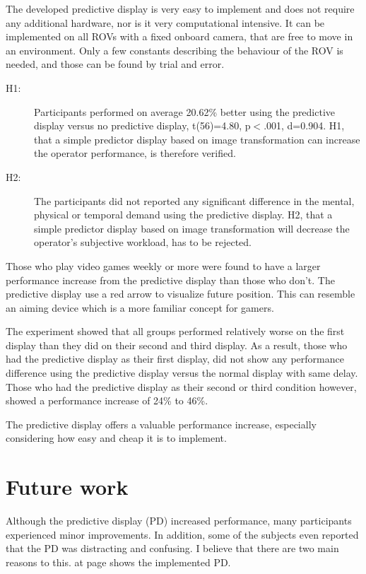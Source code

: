 The developed predictive display is very easy to implement and does not require any additional hardware, nor is it very computational intensive. It can be implemented on all ROVs with a fixed onboard camera, that are free to move in an environment. Only a few constants describing the behaviour of the ROV is needed, and those can be found by trial and error.

\begin{description}
\item[H1:] Participants performed on average 20.62\% better using the predictive display versus no predictive display, t(56)=4.80, p$<$.001, d=0.904. H1, that a simple predictor display based on image transformation can increase the operator performance, is therefore verified.

\item[H2:] The participants did not reported any significant difference in the mental, physical or temporal demand using the predictive display. H2, that a simple predictor display based on image transformation will decrease the operator's subjective workload, has to be rejected. 
\end{description}

Those who play video games weekly or more were found to have a larger performance increase from the predictive display than those who don't. The predictive display use a red arrow to visualize future position. This can resemble an aiming device which is a more familiar concept for gamers.

The experiment showed that all groups performed relatively worse on the first display than they did on their second and third display. As a result, those who had the predictive display as their first display, did not show any performance difference using the predictive display versus the normal display with same delay. Those who had the predictive display as their second or third condition however, showed a performance increase of 24\% to 46\%.

The predictive display offers a valuable performance increase, especially considering how easy and cheap it is to implement.

\section{Future work}

Although the predictive display (PD) increased performance, many participants experienced minor improvements. In addition, some of the subjects even reported that the PD was distracting and confusing. I believe that there are two main reasons to this.  at page \pageref{predictorvis} shows the implemented PD.

